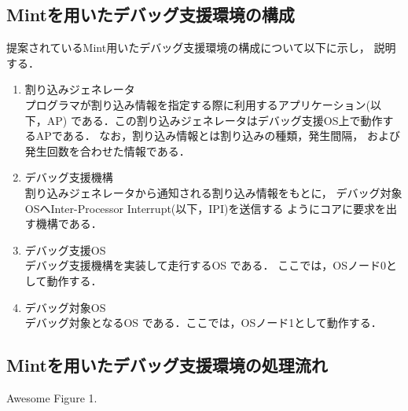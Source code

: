 \documentclass[tanilab-enum]{graduate}
\begin{document}
\subsection{Mintを用いたデバッグ支援環境の構成}
提案されているMint用いたデバッグ支援環境の構成について以下に示し，
説明する．
\begin{enumerate}
    \item 割り込みジェネレータ\\
        プログラマが割り込み情報を指定する際に利用するアプリケーション(以下，AP)
        である．この割り込みジェネレータはデバッグ支援OS上で動作するAPである．
        なお，割り込み情報とは割り込みの種類，発生間隔，
        および発生回数を合わせた情報である．
    \item デバッグ支援機構\\
        割り込みジェネレータから通知される割り込み情報をもとに，
        デバッグ対象OSへInter-Processor Interrupt(以下，IPI)を送信する
        ようにコアに要求を出す機構である．
    \item デバッグ支援OS\\
        デバッグ支援機構を実装して走行するOS である．
        ここでは，OSノード0として動作する．
    \item デバッグ対象OS\\
        デバッグ対象となるOS である．ここでは，OSノード1として動作する．
\end{enumerate}
\subsection{Mintを用いたデバッグ支援環境の処理流れ}
{Awesome Figure 1.}
\end{document}
